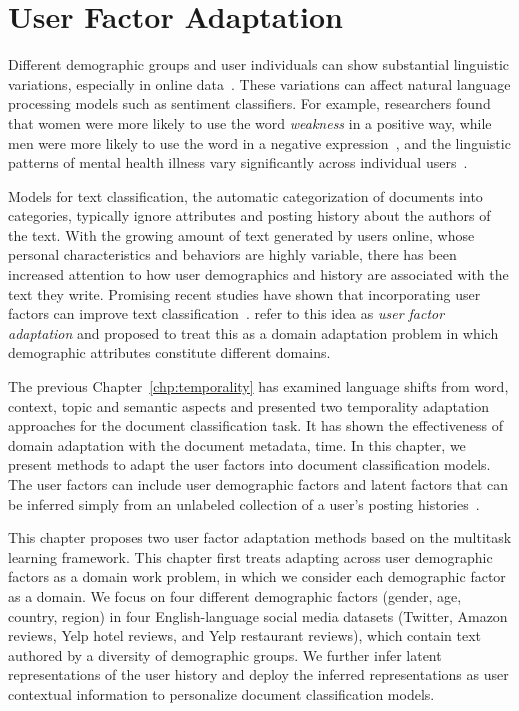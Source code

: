 \chapter{User Factor Adaptation}
\label{chp:user}

Different demographic groups and user individuals can show substantial linguistic variations, especially in online data~\cite{johannsen2015cross, goel2016social, pan2019social}. 
These variations can affect natural language processing models such as sentiment classifiers.
For example, researchers found that women were more likely to use the word \textit{weakness} in a positive way, while men were more likely to use the word in a negative expression~\cite{volkova2013exploring}, and the linguistic patterns of mental health illness vary significantly across individual users~\cite{amir2017quantifying}.

Models for text classification, the automatic categorization of documents into categories, typically ignore attributes and posting history about the authors of the text.
With the growing amount of text generated by users online, whose personal characteristics and behaviors are highly variable,
there has been increased attention to how user demographics and history are associated with the text they write.
Promising recent studies have shown that incorporating user factors can improve text classification~\cite{volkova2013exploring, hovy2015demographic, amir2016modelling, yang2017overcoming, li2018towards, pan2019social}. 
\cite{lynn2017human} refer to this idea as {\em user factor adaptation}
and proposed to treat this as a domain adaptation problem in which demographic attributes constitute different domains.

The previous Chapter~\ref{chp:temporality} has examined language shifts from word, context, topic and semantic aspects and presented two temporality adaptation approaches for the document classification task. 
It has shown the effectiveness of domain adaptation with the document metadata, time.
In this chapter, we present methods to adapt the user factors into document classification models. 
The user factors can include user demographic factors and latent factors that can be inferred simply from an unlabeled collection of a user's posting histories~\cite{lynn2017human}.

This chapter proposes two user factor adaptation methods based on the multitask learning framework. 
This chapter first treats adapting across user demographic factors as a domain work problem, in which we consider each demographic factor as a domain. 
We focus on four different demographic factors (gender, age, country, region) in four English-language social media datasets (Twitter, Amazon reviews, Yelp hotel reviews, and Yelp restaurant reviews), which contain text authored by a diversity of demographic groups.
We further infer latent representations of the user history and deploy the inferred representations as user contextual information to personalize document classification models.


